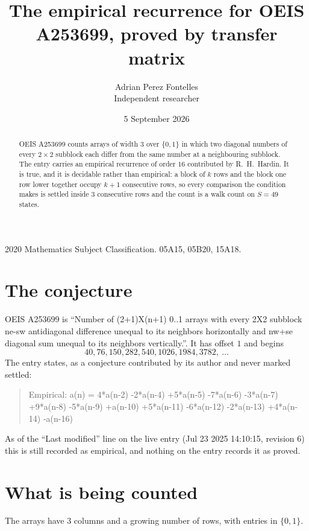 \documentclass[11pt,a4paper]{article}
\title{The empirical recurrence for OEIS A253699, proved by transfer matrix}
\author{Adrian Perez Fontelles\\ \small Independent researcher}
\date{5 September 2026}
\theoremstyle{plain}
\theoremstyle{definition}
\begin{document}
\maketitle

\begin{abstract}
OEIS A253699 counts arrays of width $3$ over $\{0,1\}$ in which two diagonal numbers of every $2\times2$ subblock each differ from the same number at a neighbouring subblock. The entry carries an
empirical recurrence of order $16$ contributed by R.~H.~Hardin. It is true, and it is
decidable rather than empirical: a block of $k$ rows and the block one row lower together
occupy $k+1$ consecutive rows, so every comparison the condition makes is settled inside
$3$ consecutive rows and the count is a walk count on $S=49$ states.
\end{abstract}

\noindent\small 2020 Mathematics Subject Classification. 05A15, 05B20, 15A18.\normalsize

\section{The conjecture}

OEIS A253699 is ``Number of (2+1)X(n+1) 0..1 arrays with every 2X2 subblock ne-sw antidiagonal difference unequal to its neighbors horizontally and nw+se diagonal sum unequal to its neighbors vertically.''. It has offset $1$ and begins
\[
40, 76, 150, 282, 540, 1026, 1984, 3782,\ \dots
\]
The entry states, as a conjecture contributed by its author and never marked settled:
\begin{quote}
Empirical: a(n) = 4*a(n-2) -2*a(n-4) +5*a(n-5) -7*a(n-6) -3*a(n-7) +9*a(n-8) -5*a(n-9) +a(n-10) +5*a(n-11) -6*a(n-12) -2*a(n-13) +4*a(n-14) -a(n-16)
\end{quote}
As of the ``Last modified'' line on the live entry (Jul 23 2025 14:10:15, revision 6) this is still
recorded as empirical, and nothing on the entry records it as proved.

\section{What is being counted}

The arrays have $3$ columns and a growing number of rows, with entries in $\{0,1\}$.
\end{document}
